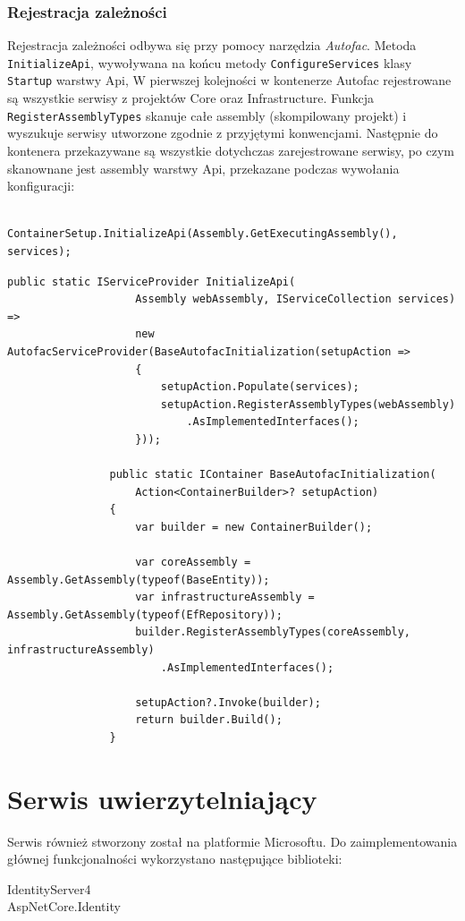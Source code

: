 		\subsubsection*{Rejestracja zależności}
			Rejestracja zależności odbywa się przy pomocy narzędzia \emph{Autofac}.
			Metoda \verb|InitializeApi|, wywoływana na końcu metody \verb|ConfigureServices| klasy \verb|Startup| warstwy Api,
			W pierwszej kolejności w kontenerze Autofac rejestrowane są wszystkie serwisy z projektów Core oraz Infrastructure.
			Funkcja \verb|RegisterAssemblyTypes| skanuje całe assembly (skompilowany projekt) i wyszukuje serwisy utworzone zgodnie z przyjętymi konwencjami.
			Następnie do kontenera przekazywane są wszystkie dotychczas zarejestrowane serwisy,
			po czym skanownane jest assembly warstwy Api, przekazane podczas wywołania konfiguracji:
			\begin{lstlisting}
				ContainerSetup.InitializeApi(Assembly.GetExecutingAssembly(), services);
			\end{lstlisting}

			\begin{lstlisting}[label=lst:autofac, caption=Rejestracja zależności wykorzystująca Autofac, float]
				public static IServiceProvider InitializeApi(
					Assembly webAssembly, IServiceCollection services) =>
					new AutofacServiceProvider(BaseAutofacInitialization(setupAction =>
					{
						setupAction.Populate(services);
						setupAction.RegisterAssemblyTypes(webAssembly)
							.AsImplementedInterfaces();
					}));
	
				public static IContainer BaseAutofacInitialization(
					Action<ContainerBuilder>? setupAction)
				{
					var builder = new ContainerBuilder();
		
					var coreAssembly = Assembly.GetAssembly(typeof(BaseEntity));
					var infrastructureAssembly = Assembly.GetAssembly(typeof(EfRepository));
					builder.RegisterAssemblyTypes(coreAssembly, infrastructureAssembly)
						.AsImplementedInterfaces();
		
					setupAction?.Invoke(builder);
					return builder.Build();
				}
			\end{lstlisting}
	
\section{Serwis uwierzytelniający}
	Serwis również stworzony został na platformie Microsoftu.
	Do zaimplementowania głównej funkcjonalności wykorzystano następujące biblioteki:
	\begin{description}
		\item[IdentityServer4] 
		\item[AspNetCore.Identity] 
	\end{description}

